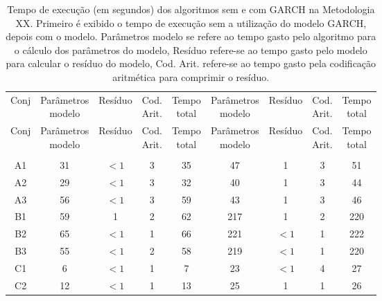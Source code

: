 \begin{center}
\begin{longtable}{ccccc|cccc}
\toprule
\rowcolor{white}
\caption[Metodologia XX: tempo de execução]{Tempo de execução (em segundos)
dos algoritmos sem e com GARCH na Metodologia XX. Primeiro é exibido o tempo de
execução sem a utilização do modelo GARCH, depois com o modelo. Parâmetros
modelo se refere ao tempo gasto pelo algoritmo para o cálculo dos parâmetros do
modelo, Resíduo refere-se ao tempo gasto pelo modelo para calcular o resíduo do
modelo, Cod. Arit. refere-se ao tempo gasto pela codificação aritmética para
comprimir o resíduo.} \label{tab:EvolucaoEntropiaMet20}\\
\midrule
Conj & \specialcell{Parâmetros\\modelo} &
Resíduo & \specialcell{Cod.\\Arit.} & \specialcell{Tempo\\total} &
\specialcell{Parâmetros\\modelo} &
Resíduo & \specialcell{Cod.\\Arit.} & \specialcell{Tempo\\total} \\
\midrule
\endfirsthead 
\midrule
\rowcolor{white}
Conj & \specialcell{Parâmetros\\modelo} &
Resíduo & \specialcell{Cod.\\Arit.} & \specialcell{Tempo\\total} &
\specialcell{Parâmetros\\modelo} &
Resíduo & \specialcell{Cod.\\Arit.} & \specialcell{Tempo\\total} \\
\toprule
\endhead
\midrule \\ %
\endfoot
\bottomrule 
\endlastfoot
A1&31&$<1$&3&35&47&1&3&51\\
A2&29&$<1$&3&32&40&1&3&44\\
A3&56&$<1$&3&59&43&1&3&46\\
B1&59&1&2&62&217&1&2&220\\
B2&65&$<1$&1&66&221&$<1$&1&222\\
B3&55&$<1$&2&58&219&$<1$&1&220\\
C1&6&$<1$&1&7&23&$<1$&4&27\\
C2&12&$<1$&1&13&25&1&1&26\\

\end{longtable}
\end{center}

